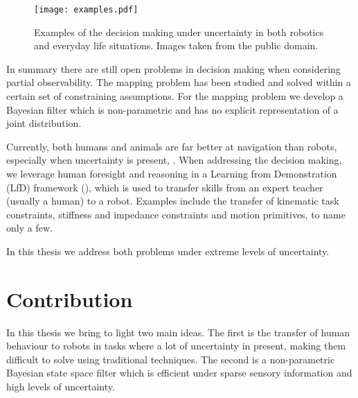 
\begin{figure}
 \centering
 \texttt{[image: examples.pdf]}
 \caption{Examples of the decision making under uncertainty in both robotics and everyday life situations. Images taken from the public domain.}
\end{figure}

In summary there are still open problems in decision making when considering partial observability. The  mapping problem has been 
studied and solved within a certain set of constraining assumptions. For the mapping problem we develop a Bayesian filter which 
is non-parametric and has no explicit representation of a joint distribution.

Currently, both humans and animals are far better at navigation than robots, especially when uncertainty is present, \cite{stankiewicz2006lost}.
When addressing the decision making, we leverage human foresight and reasoning in a Learning from Demonstration (LfD) framework (\cite{Billard08chapter}), 
which is used to transfer skills from an expert teacher (usually a human) to a robot. Examples include the transfer of 
kinematic task constraints, stiffness and impedance constraints and motion primitives, to name only a few.

In this thesis we address both problems under extreme levels of uncertainty. 



\section{Contribution}

In this thesis we bring to light two main ideas. The first is the transfer of human behaviour to robots
in tasks where a lot of uncertainty in present, making them difficult to solve using traditional techniques.
The second is a non-parametric Bayesian state space filter which is efficient under sparse sensory information 
and high levels of uncertainty.

